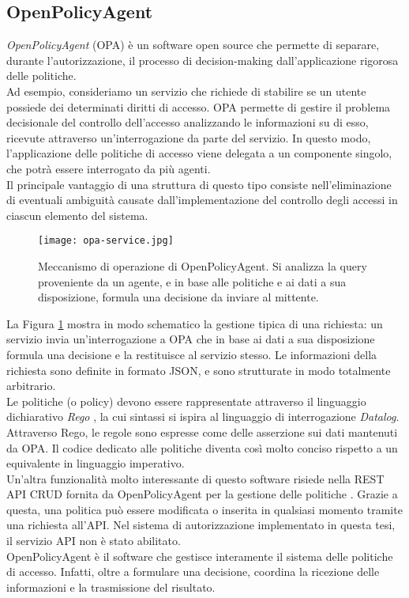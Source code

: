 \subsection{OpenPolicyAgent}
\textit{OpenPolicyAgent} (OPA) \cite{opa_bib} è un software open source che permette di separare, durante l'autorizzazione, il processo di
 decision-making  dall'applicazione rigorosa delle politiche.
\\ Ad esempio, consideriamo un servizio che richiede di stabilire se un utente possiede dei determinati diritti di accesso.
OPA permette di gestire il problema decisionale del controllo dell'accesso analizzando le informazioni su di esso, ricevute attraverso un'interrogazione da parte del servizio. 
In questo modo, l'applicazione delle politiche di accesso viene delegata a un componente singolo, che potrà essere interrogato da più 
agenti.\\ Il principale vantaggio di una struttura di questo tipo consiste nell'eliminazione di eventuali ambiguità
 causate dall'implementazione del controllo degli accessi in ciascun elemento del sistema. 
\begin{figure}[h]
    \texttt{[image: opa-service.jpg]}
    \centering
    \caption[Meccanismo di operazione di OPA]{Meccanismo di operazione di OpenPolicyAgent. Si analizza la query proveniente da un agente, e in base alle politiche e ai dati a sua disposizione, formula una decisione da inviare al mittente. }
    \label{OPAWork}
\end{figure} 
La Figura \ref*{OPAWork} mostra in modo schematico la gestione tipica di una richiesta: un servizio invia un'interrogazione
 a OPA che in base ai dati a sua disposizione formula una decisione e la restituisce al servizio stesso. 
Le informazioni della richiesta sono definite in formato JSON, e sono strutturate in modo totalmente arbitrario. 
\\ Le politiche (o policy) devono essere rappresentate attraverso il linguaggio dichiarativo 
\textit{Rego} \cite{rego_doc}, la cui sintassi si ispira al linguaggio 
di interrogazione \textit{Datalog}. 
Attraverso Rego, le regole sono espresse come delle asserzione sui dati mantenuti da OPA.
Il codice dedicato alle politiche diventa così molto conciso rispetto a un equivalente in 
linguaggio imperativo. 
\\ Un'altra funzionalità molto interessante di questo software risiede nella REST API CRUD fornita da OpenPolicyAgent per la gestione delle politiche \cite{opa_api}. Grazie a questa, una politica può essere modificata o inserita 
in qualsiasi momento tramite una richiesta all'API. Nel sistema di autorizzazione implementato in questa tesi, il servizio API non è stato abilitato. 
\\ OpenPolicyAgent è il software che gestisce interamente il sistema delle politiche di accesso. Infatti, oltre a formulare una decisione, 
coordina la ricezione delle informazioni e la trasmissione del risultato.  


